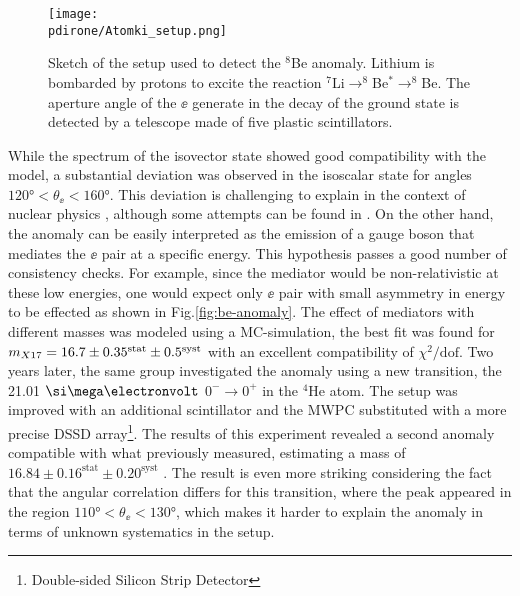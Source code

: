 \begin{figure}[htb!]
  \centering
  \texttt{[image: \\pdirone/Atomki\_setup.png]}
  \caption[Sketch of the setup used to detect the $^8$Be anomaly.]{Sketch of the setup used to detect the $^8$Be anomaly. Lithium is bombarded by protons to excite the reaction $^7$Li$\to ^8$Be$^* \to ^8$Be. The aperture angle of the $\ee$ generate in the decay of the ground state is detected by a telescope made of five plastic scintillators. \cite{PhysRevD.95.035017}}
  \label{fig:x17-setup}
\end{figure}

While the spectrum of the isovector state showed good compatibility with the model, a substantial deviation was observed in the isoscalar state for angles $120 \si{\degree} < \theta_{\ee} < 160 \si{\degree}$. This deviation is challenging to explain in the context of nuclear physics \cite{Krasznahorkay:2015iga}, although some attempts can be found in \cite{Zhang:2017zap,Koch:2020ouk}. On the other hand, the anomaly can be easily interpreted as the emission of a gauge boson that mediates the $\ee$ pair at a specific energy. This hypothesis passes a good number of consistency checks. For example, since the mediator would be non-relativistic at these low energies, one would expect only $\ee$ pair with small asymmetry in energy to be effected as shown in Fig.\ref{fig:be-anomaly}. The effect of mediators with different masses was modeled using a MC-simulation, the best fit was found for $m_{X17} = 16.7 \pm 0.35^{\textrm{stat}} \pm 0.5^{\textrm{syst}}$ with an excellent compatibility of $\chi^2/\textrm{dof}$. Two years later, the same group investigated the anomaly using a new transition, the 21.01 $\mev$ $0^- \to 0^+$ in the $^4$He atom. The setup was improved with an additional scintillator and the MWPC substituted with a more precise  DSSD array\footnote{Double-sided Silicon Strip Detector}. The results of this experiment revealed a second anomaly compatible with what previously measured, estimating a mass of $16.84 \pm 0.16^{\textrm{stat}} \pm 0.20^{\textrm{syst}}$ \cite{Krasznahorkay:2019lyl}. The result is even more striking considering the fact that the angular correlation differs for this transition, where the peak appeared in the region $110 \si{\degree} < \theta_{\ee} < 130 \si{\degree}$, which makes it harder to explain the anomaly in terms of unknown systematics in the setup.

